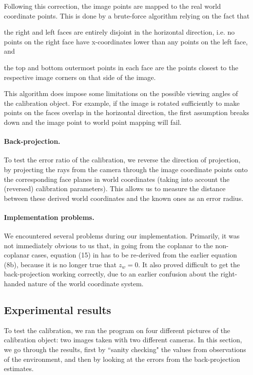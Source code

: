 Following this correction, the image points are mapped to the real
world coordinate points. This is done by a brute-force algorithm
relying on the fact that
\begin{inparaenum}[(a)]
  \item the right and left faces are entirely disjoint in the
    horizontal direction, i.e. no points on the right face have
    x-coordinates lower than any points on the left face, and
  \item the top and bottom outermost points in each face are the
    points closest to the respective image corners on that side of the
    image.
\end{inparaenum}
This algorithm does impose some limitations on the possible viewing
angles of the calibration object. For example, if the image is rotated
sufficiently to make points on the faces overlap in the horizontal direction, the
first assumption breaks down and the image point to world point
mapping will fail.

\paragraph{Back-projection.}
To test the error ratio of the calibration, we reverse the direction
of projection, by projecting the rays from the camera through the
image coordinate points onto the corresponding face planes in world
coordinates (taking into account the (reversed) calibration
parameters). This allows us to measure the distance between these
derived world coordinates and the known ones as an error radius.

\paragraph{Implementation problems.}
We encountered several problems during our implementation. Primarily,
it was not immediately obvious to us that, in going from the coplanar
to the non-coplanar cases, equation (15) in \cite{TSAI} has to be
re-derived from the earlier equation (8b), because it is no longer
true that $z_w=0$. It also proved difficult to get the back-projection
working correctly, due to an earlier confusion about the right-handed nature of the world coordinate system.

\subsection{Experimental results}
To test the calibration, we ran the program on four different
pictures of the calibration object: two images taken with two different cameras.
In this section, we go through the results, first by ``sanity
checking" the values from observations of the environment, and then
by looking at the errors from the back-projection estimates.

